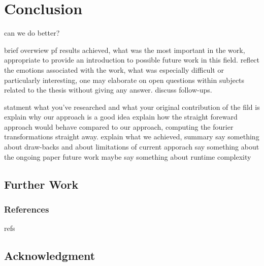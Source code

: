 \chapter{Conclusion}

can we do better?

brief overwiew pf results achieved, what was the most important in the work, appropriate to provide an introduction to possible future work in this field. reflect the emotions associated with the work, what was especially difficult or particularly interesting, one may elaborate on open questions within subjects related to the thesis without giving any answer. discuss follow-ups.

statment what you've researched and what your original contribution of the fild is
explain why our approach is a good idea
explain how the straight foreward approach would behave compared to our approach, computing the fourier transformations straight away.
explain what we achieved, summary
say something about draw-backs and about limitations of current apporach
say something about the ongoing paper future work
maybe say something about runtime complexity

\section{Further Work}
\subsection{References}
refs
  
  
\section{Acknowledgment}
